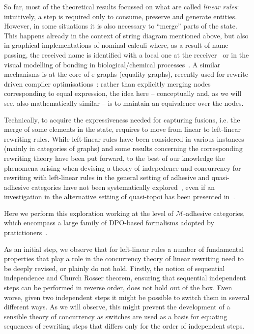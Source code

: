 \documentclass[a4paper,UKenglish,cleveref,pdftex,thm-restate,numberwithinsect,anonymous]{lipics}
\begin{document}
So far, most of the theoretical results focussed on what are called
\emph{linear rules}: intuitively, a step is required only to consume,
preserve and generate entities.  However, in some situations it is
also necessary to ``merge'' parts of the state.  This happens already
in the context of string diagram mentioned above, but also in
graphical implementations of nominal calculi where, as a result of
name passing, the received name is identified with a local one at the
receiver~\cite{CVY:ESSPE,Gad07} or in the visual modelling of bonding
in biological/chemical processes~\cite{PUY:MBPE}. A similar mechanisms
is at the core of e-graphs (equality graphs), recently used for
rewrite-driven compiler optimisations~\cite{WNW:egg}: rather than
explicitly merging nodes corresponding to equal expression, the idea
here -- conceptually and, as we will see, also mathematically similar
-- is to maintain an
equivalence %
over the nodes.



Technically, to acquire the expressiveness needed for capturing
fusions, i.e. the merge of some elements in the state, requires to
move from linear to left-linear rewriting rules. While left-linear
rules have been considered in various instances (mainly in categories
of graphs) and some results concerning the corresponding rewriting
theory have been put forward, to the best of our knowledge the
phenomena arising when devising a theory of indepedence and
concurrency for rewriting with left-linear rules in the general
setting of adhesive and quasi-adhesive categories
have not been systematically
explored~\cite{Ehrig1976,EHP:BRfTToHLRS,baldan2011adhesivity},
even if an investigation in the alternative setting of quasi-topoi has 
been presented in~\cite{BehrHK23}.

Here we perform this exploration working at the level of $\mathcal{M}$-adhesive categories, 
which encompass a large family of DPO-based formalisms adopted by pratictioners~\cite{xxx}. 

As an initial step, %
we observe that for
left-linear rules a number of fundamental properties that play a role
in the concurrency theory of linear rewriting need to be deeply revised, or
plainly do not hold.
%
Firstly, the notion of sequential independence and Church Rosser
theorem, ensuring that sequential independent steps can be performed
in reverse order, does not hold out of the box. Even worse, given two
independent steps it might be possible to switch them in several
different ways. As we will observe, this might prevent the development
of a sensible theory of concurrency as switches are used as a basis
for equating sequences of rewriting steps that differs only for the order of independent
steps.
\end{document}

